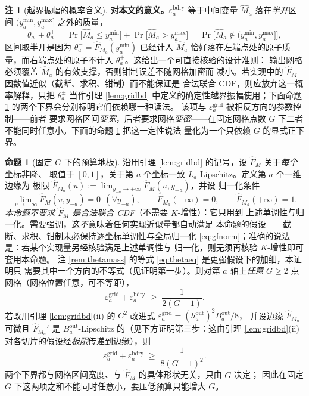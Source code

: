 \documentclass[a4paper,11pt]{article}
\theoremstyle{definition}
\newtheorem{proposition}{命题}
\newtheorem{remark}{注}
\newcommand{\1}{\mathbf 1}
\begin{document}
\begin{remark}[越界振幅的概率含义]
\textbf{对本文的意义。}$\varepsilon_a^{\mathrm{bdry}}$ 等于中间变量
$\widehat M_a$ 落在\emph{半开}区间 $(y_a^{\min},y_a^{\max}]$ 之外的质量，
\[
\theta_a^-+\theta_a^+
=\Pr\bigl[\widehat M_a\le y_a^{\min}\bigr]+\Pr\bigl[\widehat M_a>y_a^{\max}\bigr]
=\Pr\bigl[\widehat M_a\notin(y_a^{\min},y_a^{\max}]\bigr] ,
\]
区间取半开是因为 $\theta_a^-=\widehat F_{M_a}(y_a^{\min})$ 已经计入
$\widehat M_a$ 恰好落在左端点处的原子质量，而右端点处的原子不计入
$\theta_a^+$。这给出一个可直接核验的设计准则：
输出网格必须覆盖 $\widehat M_a$ 的有效支撑，否则钳制误差不随网格加密而
减小。若实现中的 $\widehat F_M$ 因数值近似（截断、求积、钳制）而不能保证是
合法联合 CDF，则应放弃这一概率解释，只把 $\theta_a^{\pm}$ 当作引理
\ref{lem:gridbd} 中定义的确定性越界振幅使用；下面命题 \ref{prop:gridfloor}
的两个下界会分别标明它们依赖哪一种读法。
该项与 $\varepsilon_a^{\mathrm{grid}}$ 被相反方向的参数控制——前者
要求网格区间\emph{变宽}，后者要求网格\emph{变密}——在固定网格点数 $G$
下二者不能同时任意小。下面的命题 \ref{prop:gridfloor} 把这一定性说法
量化为一个只依赖 $G$ 的显式正下界。
\end{remark}

\begin{proposition}[固定 $G$ 下的预算地板]
\label{prop:gridfloor}
沿用引理 \ref{lem:gridbd} 的记号，设 $\widehat F_M$ 关于\emph{每个}坐标非降、
取值于 $[0,1]$，关于第 $a$ 个坐标一致 $L_a$-Lipschitz。定义第 $a$ 个一维边缘为
极限 $\widehat F_{M_a}(u):=\lim_{y_{-a}\to+\infty}\widehat F_M(u,y_{-a})$，并设
归一化条件
\begin{equation}
\label{eq:gfnorm}
\lim_{v\to-\infty}\widehat F_M(v,y_{-a})=0\ \ (\forall y_{-a}),
\qquad
\widehat F_{M_a}(-\infty)=0,\qquad \widehat F_{M_a}(+\infty)=1 .
\end{equation}
\emph{本命题不要求 $\widehat F_M$ 是合法联合 CDF}（不需要 $K$-增性）：它只用到
上述单调性与归一化。需要强调，这\emph{不}意味着任何实现近似量都自动满足
本命题的假设——截断、求积、钳制未必保持逐坐标单调性与全局归一化
\eqref{eq:gfnorm}；准确的说法是：若某个实现量另经核验满足上述单调性与
归一化，则无须再核验 $K$-增性即可套用本命题。
注 \ref{rem:thetamass} 的等式 \eqref{eq:thetaeq} 是更强假设下的加细，本证明只
需要其中一个方向的不等式（见证明第一步）。则对第 $a$ 轴上\emph{任意}
$G\ge2$ 点网格（网格位置任意，可不等距），
\begin{equation}
\label{eq:gridfloor}
\varepsilon_a^{\mathrm{grid}}+\varepsilon_a^{\mathrm{bdry}}
\;\ge\;
\frac{1}{2(G-1)} .
\end{equation}
若改用引理 \ref{lem:gridbd}(ii) 的 $C^2$ 改进式
$\varepsilon_a^{\mathrm{grid}}=(h_a^{\mathrm{out}})^2B_a^{\mathrm{out}}/8$，
并设边缘 $\widehat F_{M_a}$ 可微且 $\widehat F_{M_a}'$ 是
$B_a^{\mathrm{out}}$-Lipschitz 的（见下方证明第三步：这由引理
\ref{lem:gridbd}(ii) 对各切片的假设经\emph{极限}传递到边缘），则
\[
\varepsilon_a^{\mathrm{grid}}+\varepsilon_a^{\mathrm{bdry}}
\;\ge\;
\frac{1}{8(G-1)^2} .
\]
两个下界都与网格区间宽度、与 $\widehat F_M$ 的具体形状无关，只由 $G$ 决定；
因此在固定 $G$ 下这两项之和不能同时任意小，要压低预算只能增大 $G$。
\end{proposition}
\end{document}
